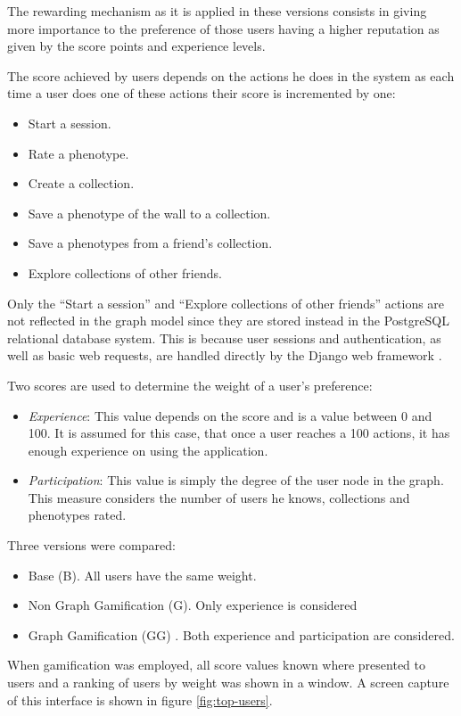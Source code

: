 \documentclass[conference]{IEEEtran}
\begin{document}
The rewarding mechanism as it is applied in these versions 
consists in giving more importance to the preference of those users having a higher reputation
as given by the score points and experience levels.  

The score achieved by users depends on the actions he does in the system as
each time a user does one of these actions their score is incremented by one:
\begin{itemize}
\item Start a session.
\item Rate a phenotype.
\item Create a collection.
\item Save a phenotype of the wall to a collection.
\item Save a phenotypes from a friend's collection.
\item Explore collections of other friends.
\end{itemize}

Only the ``Start a session'' and ``Explore collections of other friends'' actions 
are not reflected in the graph model since they are stored instead in the PostgreSQL relational
database system. This is because user sessions and authentication, as well as basic
web requests, are handled directly by the Django web framework \cite{garcia2013evospace}.  

Two scores are used to determine the weight of a user's preference:
\begin{itemize}
\item {\em Experience}: This value depends on the score and is a value 
between 0 and 100. It is assumed for this case, that once a user
reaches a 100 actions, it has enough experience on using the application.   

\item {\em Participation}: This value is simply the degree of the user node 
in the graph. This measure considers the number of users he knows,
collections and phenotypes rated.    
\end{itemize}

Three versions were compared:
\begin{itemize}
\item Base (B). All users have the same weight.
\item Non Graph Gamification (G). Only experience is considered
\item Graph Gamification (GG) . Both experience and participation are considered.
\end{itemize}
When gamification was employed, all score values known where presented to users
and a ranking of users by weight was shown in a window. A screen capture of
this interface is shown in figure \ref{fig:top-users}. 
\end{document}
